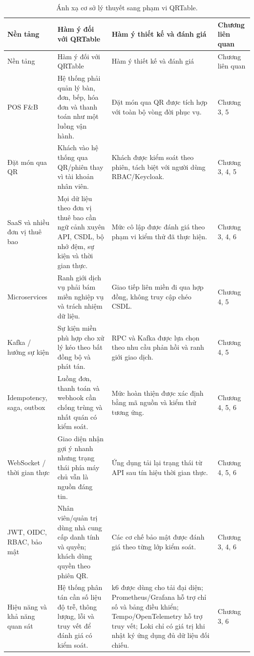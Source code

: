 {\footnotesize\sloppy
\setlength{\tabcolsep}{3pt}
\begin{longtable}{>{\raggedright\arraybackslash}p{}>{\raggedright\arraybackslash}p{}>{\raggedright\arraybackslash}p{}>{\raggedright\arraybackslash}p{}}
  \caption{Ánh xạ cơ sở lý thuyết sang phạm vi QRTable.}
  \label{tab:chapter2-theory-to-qrtable}\\
  \toprule
  Nền tảng & Hàm ý đối với QRTable & Hàm ý thiết kế và đánh giá & Chương liên quan \\
  \midrule
  \endfirsthead
  \toprule
  Nền tảng & Hàm ý đối với QRTable & Hàm ý thiết kế và đánh giá & Chương liên quan \\
  \midrule
  \endhead
  \bottomrule
  \endfoot
  POS F\&B & Hệ thống phải quản lý bàn, đơn, bếp, hóa đơn và thanh toán như một luồng vận hành. & Đặt món qua QR được tích hợp với toàn bộ vòng đời phục vụ. & Chương 3, 5 \\
  \addlinespace
  Đặt món qua QR & Khách vào hệ thống qua QR/phiên thay vì tài khoản nhân viên. & Khách được kiểm soát theo phiên, tách biệt với người dùng RBAC/Keycloak. & Chương 3, 4, 5 \\
  \addlinespace
  SaaS và nhiều đơn vị thuê bao & Mọi dữ liệu theo đơn vị thuê bao cần ngữ cảnh xuyên API, CSDL, bộ nhớ đệm, sự kiện và thời gian thực. & Mức cô lập được đánh giá theo phạm vi kiểm thử đã thực hiện. & Chương 3, 4, 6 \\
  \addlinespace
  Microservices & Ranh giới dịch vụ phải bám miền nghiệp vụ và trách nhiệm dữ liệu. & Giao tiếp liên miền đi qua hợp đồng, không truy cập chéo CSDL. & Chương 4, 5 \\
  \addlinespace
  Kafka / hướng sự kiện & Sự kiện miền phù hợp cho xử lý kéo theo bất đồng bộ và phát tán. & RPC và Kafka được lựa chọn theo nhu cầu phản hồi và ranh giới giao dịch. & Chương 4, 5 \\
  \addlinespace
  Idempotency, saga, outbox & Luồng đơn, thanh toán và webhook cần chống trùng và nhất quán có kiểm soát. & Mức hoàn thiện được xác định bằng mã nguồn và kiểm thử tương ứng. & Chương 4, 5, 6 \\
  \addlinespace
  WebSocket / thời gian thực & Giao diện nhận gợi ý nhanh nhưng trạng thái phía máy chủ vẫn là nguồn đáng tin. & Ứng dụng tải lại trạng thái từ API sau tín hiệu thời gian thực. & Chương 4, 5, 6 \\
  \addlinespace
  JWT, OIDC, RBAC, bảo mật & Nhân viên/quản trị dùng nhà cung cấp danh tính và quyền; khách dùng quyền theo phiên QR. & Các cơ chế bảo mật được đánh giá theo từng lớp kiểm soát. & Chương 3, 4, 6 \\
  \addlinespace
  Hiệu năng và khả năng quan sát & Hệ thống phân tán cần số liệu độ trễ, thông lượng, lỗi và truy vết để đánh giá có kiểm soát. & k6 được dùng cho tải đại diện; Prometheus/Grafana hỗ trợ chỉ số và bảng điều khiển; Tempo/OpenTelemetry hỗ trợ truy vết; Loki chỉ có giá trị khi nhật ký ứng dụng đủ dữ liệu đối chiếu. & Chương 3, 6 \\
\end{longtable}
}

